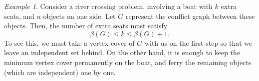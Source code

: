 \documentclass[11pt]{article}
\theoremstyle{definition}
\theoremstyle{remark}
\newtheorem*{example}{Example}
\numberwithin{equation}{section}
\begin{document}
    \begin{example}
        Consider a river crossing problem, involving a boat with $k$ extra seats, and
        $n$ objects on one side. Let $G$ represent the conflict graph between these
        objects. Then, the number of extra seats must satisfy \[
            \beta(G) \leq k \leq \beta(G) + 1.
        \] To see this, we must take a vertex cover of $G$ with us on the first step
        so that we leave an independent set behind. On the other hand, it is enough
        to keep the minimum vertex cover permanently on the boat, and ferry the
        remaining objects (which are independent) one by one.
    \end{example}
\end{document}
